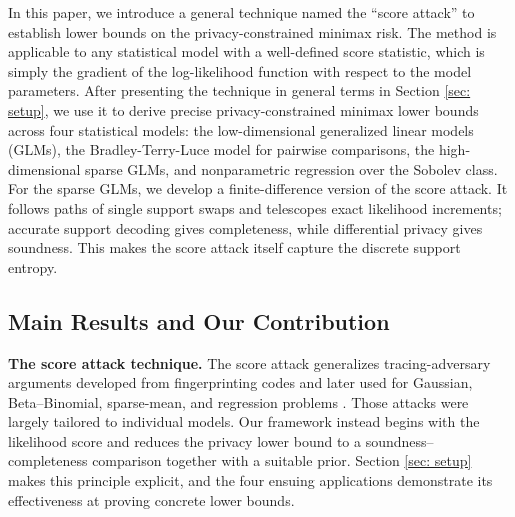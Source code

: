 \documentclass[letterpaper,12pt]{article}
\numberwithin{equation}{section}
\theoremstyle{plain}
\numberwithin{Theorem}{section}
\numberwithin{proposition}{section}
\numberwithin{Lemma}{section}
{
	\theoremstyle{definition}
	\newtheorem{Definition}{Definition}
	\newtheorem{example}{Example}
	\numberwithin{example}{section}
	\newtheorem{fact}{Fact}
	\numberwithin{fact}{section}
	\newtheorem{remark}{Remark}
}
\newcommand{\furtherrev}[1]{#1}
\newcommand{\1}{\mathbbm{1}}
\begin{document}
In this paper, we introduce a general technique named the ``score attack'' to establish lower bounds on the privacy-constrained minimax risk. The method is applicable to any statistical model with a well-defined score statistic, which is simply the gradient of the log-likelihood function with respect to the model parameters. After presenting the technique in general terms in Section \ref{sec: setup}, we use it to derive precise privacy-constrained minimax lower bounds across four statistical models: the low-dimensional generalized linear models (GLMs), the Bradley-Terry-Luce model for pairwise comparisons, the high-dimensional sparse GLMs, and \furtherrev{nonparametric} regression over the Sobolev class. {For the sparse GLMs, we develop a finite-difference version of the score attack. It follows paths of single support swaps and telescopes exact likelihood increments; accurate support decoding gives completeness, while differential privacy gives soundness. This makes the score attack itself capture the discrete support entropy.}

\subsection{Main Results and Our Contribution}

\textbf{The score attack technique.}
The score attack generalizes tracing-adversary arguments developed from fingerprinting codes \cite{bun2014fingerprinting,dwork2015robust} and later used for Gaussian, Beta--Binomial, sparse-mean, and regression problems \citep{steinke2017tight,kamath2018privately,cai2021cost}. Those attacks were largely tailored to individual models. Our framework instead begins with the likelihood score and reduces the privacy lower bound to a soundness--completeness comparison together with a suitable prior. Section \ref{sec: setup} makes this principle explicit, and the four ensuing applications demonstrate its effectiveness at proving concrete lower bounds.
\end{document}

